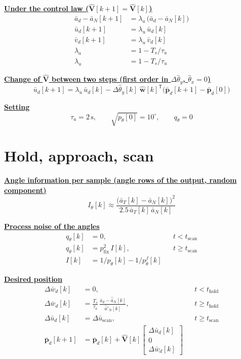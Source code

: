 \documentclass[11pt,a4paper]{ctexart}
\newcommand{\ba}{\bar{a}}
\newcommand{\bw}{\bar{w}}
\newcommand{\Pfix}{p_{\mathrm{fix}}}
\newcommand{\hd}[1]{\par\bigskip\noindent\underline{\textbf{#1}}}
\begin{document}
\hd{Under the control law ($\hat{\mathbf{V}}[k+1] = \hat{\mathbf{V}}[k]$)}
\[
\begin{aligned}
\ba_d - \ba_N[k+1] &= \lambda_a\,\big(\ba_d - \ba_N[k]\big) \\
\bar{u}_d[k+1] &= \lambda_u\,\bar{u}_d[k] \\
\bar{v}_d[k+1] &= \lambda_u\,\bar{v}_d[k] \\
\lambda_a &= 1 - T_s/\tau_a \\
\lambda_u &= 1 - T_s/\tau_u
\end{aligned}
\]

\hd{Change of $\hat{\mathbf{V}}$ between two steps (first order in $\Delta\hat{\theta}_y$, $\hat{\theta}_x = 0$)}
\[
\bar{u}_d[k+1] = \lambda_u\,\bar{u}_d[k] - \Delta\hat{\theta}_y[k]\;\hat{\mathbf{w}}[k]^{\mathsf{T}}\big(\bar{\mathbf{p}}_d[k+1] - \bar{\mathbf{p}}_d[0]\big)
\]

\hd{Setting}
\[
\tau_a = 2\,\mathrm{s}, \qquad \sqrt{p_{\theta}[0]} = 10^{\circ}, \qquad q_{\theta} = 0
\]

\clearpage
\section{Hold, approach, scan}

\hd{Angle information per sample (angle rows of the output, random component)}
\[
I_{\theta}[k] \approx \frac{\big(\ba_T[k] - \ba_N[k]\big)^2}{2.5\,\ba_T[k]\,\ba_N[k]}
\]

\hd{Process noise of the angles}
\[
\begin{aligned}
q_{\theta}[k] &= 0, && t < t_{\mathrm{scan}} \\
q_{\theta}[k] &= \Pfix^2\, I[k], && t \ge t_{\mathrm{scan}} \\
I[k] &= 1/p_{\theta}[k] - 1/p^{f}_{\theta}[k]
\end{aligned}
\]

\hd{Desired position}
\[
\begin{aligned}
\Delta\bw_d[k] &= 0, && t < t_{\mathrm{hold}} \\
\Delta\bw_d[k] &= \frac{T_s}{\tau_a}\,\frac{\ba_d - \hat{\ba}_N[k]}{\hat{\ba}'_N[k]}, && t \ge t_{\mathrm{hold}} \\
\Delta\bar{u}_d[k] &= \Delta\bar{u}_{\mathrm{scan}}, && t \ge t_{\mathrm{scan}} \\
\bar{\mathbf{p}}_d[k+1] &= \bar{\mathbf{p}}_d[k] + \hat{\mathbf{V}}[k] \begin{bmatrix} \Delta\bar{u}_d[k] \\ 0 \\ \Delta\bw_d[k] \end{bmatrix}
\end{aligned}
\]
\end{document}
